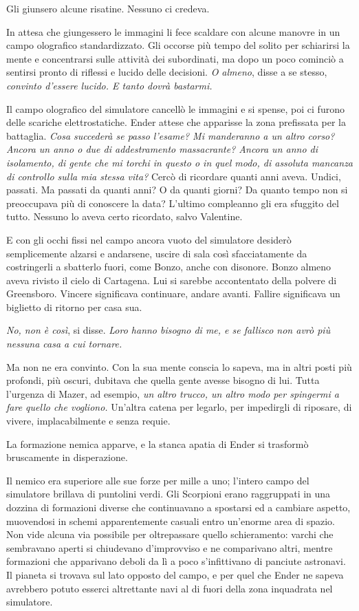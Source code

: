 {Gli giunsero alcune risatine. Nessuno ci credeva.}

{In attesa che giungessero le immagini li fece scaldare con alcune
	manovre in un campo olografico standardizzato. Gli occorse più tempo del
	solito per schiarirsi la mente e concentrarsi sulle attività dei
	subordinati, ma dopo un poco cominciò a sentirsi pronto di riflessi e
	lucido delle decisioni. \emph{O almeno}, \emph{} disse a se stesso,
	\emph{convinto d'essere lucido. E tanto dovrà bastarmi.}}

{Il campo olografico del simulatore cancellò le immagini e si spense,
	poi ci furono delle scariche elettrostatiche. Ender attese che apparisse
	la zona prefissata per la battaglia. \emph{Cosa succederà se passo
		l'esame? Mi manderanno a un altro corso? Ancora un anno o due di
		addestramento massacrante? Ancora un anno di isolamento, di gente che mi
		torchi in questo o in quel modo, di assoluta mancanza di controllo sulla
		mia stessa vita?} Cercò di ricordare quanti anni aveva. Undici, passati.
	Ma passati da quanti anni? O da quanti giorni? Da quanto tempo non si
	preoccupava più di conoscere la data? L'ultimo compleanno gli era
	sfuggito del tutto. Nessuno lo aveva certo ricordato, salvo Valentine.}

{E con gli occhi fissi nel campo ancora vuoto del simulatore desiderò
	semplicemente alzarsi e andarsene, uscire di sala così sfacciatamente da
	costringerli a sbatterlo fuori, come Bonzo, anche con disonore. Bonzo
	almeno aveva rivisto il cielo di Cartagena. Lui si sarebbe accontentato
	della polvere di Greensboro. Vincere significava continuare, andare
	avanti. Fallire significava un biglietto di ritorno per casa sua.}

\emph{{No, non è così}}{, \emph{} si disse. \emph{Loro hanno bisogno di
		me, e se fallisco non avrò più nessuna casa a cui tornare.}}

{Ma non ne era convinto. Con la sua mente conscia lo sapeva, ma in altri
	posti più profondi, più oscuri, dubitava che quella gente avesse bisogno
	di lui. Tutta l'urgenza di Mazer, ad esempio, \emph{un altro trucco, un
		altro modo per spingermi a fare quello che vogliono.} Un'altra catena
	per legarlo, per impedirgli di riposare, di vivere, implacabilmente e
	senza requie.}

{La formazione nemica apparve, e la stanca apatia di Ender si trasformò
	bruscamente in disperazione.}

{Il nemico era superiore alle sue forze per mille a uno; l'intero campo
	del simulatore brillava di puntolini verdi. Gli Scorpioni erano
	raggruppati in una dozzina di formazioni diverse che continuavano a
	spostarsi ed a cambiare aspetto, muovendosi in schemi apparentemente
	casuali entro un'enorme area di spazio. Non vide alcuna via possibile
	per oltrepassare quello schieramento: varchi che sembravano aperti si
	chiudevano d'improvviso e ne comparivano altri, mentre formazioni che
	apparivano deboli da lì a poco s'infittivano di panciute astronavi. Il
	pianeta si trovava sul lato opposto del campo, e per quel che Ender ne
	sapeva avrebbero potuto esserci altrettante navi al di fuori della zona
	inquadrata nel simulatore.}

